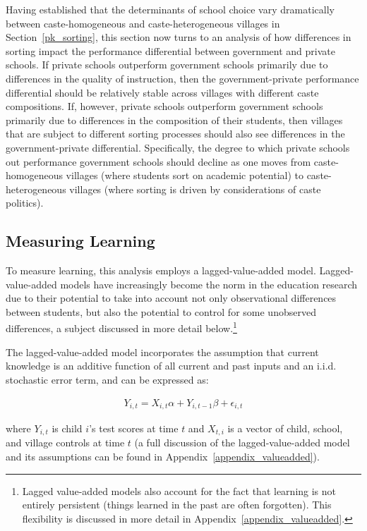 \documentclass[Eubank_pk_ethnic_sorting.tex]{subfiles}
\begin{document}
Having established that the determinants of school choice vary dramatically between caste-homogeneous and caste-heterogeneous villages in Section~\ref{pk_sorting}, this section now turns to an analysis of how differences in sorting impact the performance differential between government and private schools. If private schools outperform government schools primarily due to differences in the quality of instruction, then the government-private performance differential should be relatively stable across villages with different caste compositions. If, however, private schools outperform government schools primarily due to differences in the composition of their students, then villages that are subject to different sorting processes should also see differences in the government-private differential. Specifically, the degree to which private schools out performance government schools should decline as one moves from caste-homogeneous villages (where students sort on academic potential) to caste-heterogeneous villages (where sorting is driven by considerations of caste politics). 

\subsection{Measuring Learning}\label{value_added_models}

To measure learning, this analysis employs a lagged-value-added model. Lagged-value-added models have increasingly become the norm in the education research \citep{Gordon:2006wt,McCaffrey:2003vk,Hanushek:2003hz} due to their potential to take into account not only observational differences between students, but also the potential to control for some unobserved differences, a subject discussed in more detail below.\footnote{Lagged value-added models also account for the fact that learning is not entirely persistent (things learned in the past are often forgotten). This flexibility is discussed in more detail in Appendix~\ref{appendix_valueadded}.} 

The lagged-value-added model incorporates the assumption that current knowledge is an additive function of all current and past inputs and an i.i.d. stochastic error term, and can be expressed as:

\begin{eqnarray}
	Y_{i,t}=X_{i,t}\alpha+Y_{i,t-1}\beta + \epsilon_{i,t}\label{primary}
\end{eqnarray}

where $Y_{i,t}$ is child $i$'s test scores at time $t$ and $X_{t,i}$ is a vector of child, school, and village controls at time $t$ (a full discussion of the lagged-value-added model and its assumptions can be found in Appendix~\ref{appendix_valueadded}). 
\end{document}
